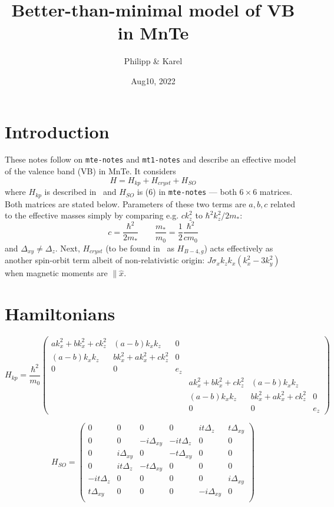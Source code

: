 \documentclass{article}
\title{Better-than-minimal model of VB in MnTe}
\author{Philipp \& Karel}
\date{Aug10, 2022}
\begin{document}
\maketitle

\section*{Introduction}

These notes follow on {\tt mte-notes} and {\tt mt1-notes} and describe
an effective model of the valence band (VB) in MnTe. It considers
%
\begin{equation}
  H=H_{kp}+H_{cryst}+H_{SO}
\label{eq-01}
\end{equation}
%
where $H_{kp}$ is described in~\cite{PFjr} and $H_{SO}$ is (6) in
{\tt mte-notes} --- both $6\times 6$ matrices. Both matrices are stated below. Parameters of these two
terms are $a,b,c$ related to the effective masses simply by comparing
e.g. $ck_z^2$ to $\hbar^2 k_z^2/2m_*$:
%
\begin{equation}
  c=\frac{\hbar^2}{2m_*}\qquad \frac{m_*}{m_0}={\textstyle{\frac12}} \frac{\hbar^2}{cm_0}
  \label{eq-02}
\end{equation}  
%
and $\Delta_{xy}\not=\Delta_z$. Next, $H_{cryst}$ (to be found in~\cite{LandT}
as $H_{B-4,g}$) acts effectively as another spin-orbit term albeit of
non-relativistic origin: $J\sigma_x k_zk_x(k_x^2-3k_y^2)$ when magnetic
moments are $\parallel \hat{x}$. 

\section*{Hamiltonians}
$$ H_{kp} = \frac{\hbar^2}{m_0} \begin{pmatrix}
	a k_x^2 + b k_x^2 + c k_z^2 & (a-b) k_x k_z & 0 & & &\\
	(a-b) k_x k_z & b k_x^2 + a k_x^2 + c k_z^2 & 0 & & & \\
	0 & 0 & e_z & & & \\
	& & & a k_x^2 + b k_x^2 + c k_z^2 & (a-b) k_x k_z \\
	& & & (a-b) k_x k_z & b k_x^2 + a k_x^2 + c k_z^2 & 0 \\
	& & & 0 & 0 & e_z
\end{pmatrix}$$

$$ H_{SO} = \begin{pmatrix} 
0 & 0 & 0 & 0 & it\Delta_z & t \Delta_{xy} \\
0 & 0 & -i \Delta_{xy} & -it\Delta_z & 0 & 0 \\
0 & i \Delta_{xy} & 0 & -t \Delta_{xy} & 0 & 0 \\
0 & it\Delta_z & -t \Delta_{xy} & 0 & 0 & 0 \\
-it\Delta_z & 0 & 0 & 0 & 0 & i \Delta_{xy} \\
t \Delta_{xy} & 0 & 0 & 0 & -i \Delta_{xy} & 0 \\
\end{pmatrix}$$
\end{document}
